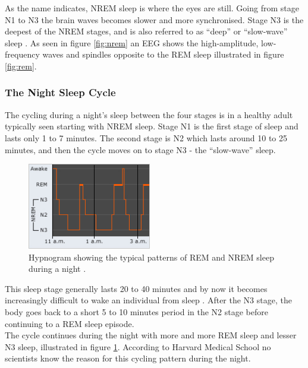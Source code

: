 \documentclass[12pt]{article} %
\begin{document}
As the name indicates, NREM sleep is where the eyes are still. Going from stage N1 to N3 the brain waves becomes slower and more synchronised. Stage N3 is the deepest of the NREM stages, and is also referred to as ``deep'' or ``slow-wave'' sleep \cite{harvard}. As seen in figure \ref{fig:nrem} an EEG shows the high-amplitude, low-frequency waves and spindles opposite to the REM sleep illustrated in figure \ref{fig:rem}. 


\subsubsection{The Night Sleep Cycle}
The cycling during a night's sleep between the four stages is in a healthy adult typically seen starting with NREM sleep. Stage N1 is the first stage of sleep and lasts only 1 to 7 minutes. The second stage is N2 which lasts around 10 to 25 minutes, and then the cycle moves on to stage N3 - the ``slow-wave'' sleep. 

\begin{figure}
  \begin{center}
    \includegraphics[width=0.48\textwidth]{img/hyp}
  \end{center}
    \vspace{-20pt}
  \caption{Hypnogram showing the typical patterns of REM and NREM sleep during a night \cite{harvard}.}
  \label{fig:hyp}
\end{figure}

This sleep stage generally lasts 20 to 40 minutes and by now it becomes increasingly difficult to wake an individual from sleep \cite{harvard}. After the N3 stage, the body goes back to a short 5 to 10 minutes period in the N2 stage before continuing to a REM sleep episode. \\

The cycle continues during the night with more and more REM sleep and lesser N3 sleep, illustrated in figure \ref{fig:hyp}. According to Harvard Medical School \cite{harvard} no scientists know the reason for this cycling pattern during the night. 
\end{document}
